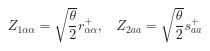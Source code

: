 \begin{equation}
Z_{1\alpha {{ \alpha}}}=
\sqrt{\frac{\theta }{2}}r_{\alpha {{\alpha}}}^{+},\ \ \ \
Z_{2a{ {a}}}=\sqrt{\frac{\theta }{2}} s_{a{a}}^{+}
\end{equation} 
